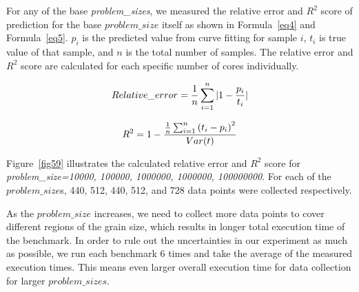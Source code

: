 For any of the base \emph{problem\_{sizes}}, we measured the relative error and $R^2$ score of prediction for the base $problem\_{size}$ itself as shown in Formula~\ref{eq4} and Formula~\ref{eq5}. 
$p_i$ is the predicted value from curve fitting for sample $i$, $t_i$ is true value of that sample, and $n$ is the total number of samples.
The relative error and $R^2$ score are calculated for each specific number of cores individually. 

\begin{equation}{\label{eq4}}
Relative\_{error} = \frac{1}{n}\sum_{i=1}^{n} {|1-\frac{p_i}{t_i}|}
\end{equation}


\begin{equation}{\label{eq5}}
R^2 = 1-\frac{{\frac{1}{n}\sum_{i=1}^{n}{(t_i-p_i)}^2}}{Var(t)}
\end{equation}

Figure~\ref{fig59} illustrates the calculated relative error and $R^2$ score for \emph{problem\_{size}=10000, 100000, 1000000, 1000000, 100000000}. For each of the $problem\_{size}$s, 440, 512, 440, 512, and 728 data points were collected respectively. 

As the $problem\_{size}$ increases, we need to collect more data points to cover different regions of the grain size,  which results in longer total execution time of the benchmark. In order to rule out the uncertainties in our experiment as much as possible, we run each benchmark 6 times and take the average of the measured execution times. This means even larger overall execution time for data collection for larger $problem\_{sizes}$. 


